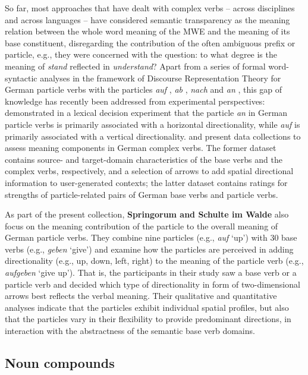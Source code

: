 \documentclass[output=paper]{langsci/langscibook}
\begin{document}
So far, most approaches that have dealt with complex verbs -- across
disciplines and across languages -- have considered semantic
transparency as the meaning relation between the whole word meaning of
the MWE and the meaning of its base constituent, disregarding the
contribution of the often ambiguous prefix or particle, e.g., they
were concerned with the question: to what degree is the meaning of
\textit{stand} reflected in \textit{understand}? Apart from a series
of formal word-syntactic analyses in the framework of
Discourse Representation Theory \citep{Kamp/Reyle:93} for
German particle verbs with the particles \textit{auf}
\citep{Lechler/Rossdeutscher:09}, \textit{ab} \citep{Kliche:11}, \textit{nach}
\citep{Haselbach:11} and 
\textit{an} \citep{Springorum:11}, this gap of knowledge has recently been
addressed from experimental perspectives: \cite{FrassinelliEtAl:17}
demonstrated in a lexical decision experiment that the particle
\textit{an} in German particle verbs is primarily associated with a
horizontal directionality, while \textit{auf} is primarily associated
with a vertical directionality. \citet{SchulteImWaldeEtAl:18} and
\citet{Koeper/SchulteImWalde:18} present data collections to assess
meaning components in German complex verbs. The former dataset
contains source- and target-domain characteristics of the base verbs
and the complex verbs, respectively, and a selection of arrows to add
spatial directional information to user-generated contexts; the latter
dataset contains ratings for strengths of particle-related pairs of
German base verbs and particle verbs.

As part of the present collection, \textbf{Springorum and Schulte im
  Walde} also focus on the meaning contribution of the particle to the
overall meaning of German particle verbs. They combine nine particles
(e.g., \textit{auf} `up') with 30 base verbs (e.g., \textit{geben}
`give') and examine how the particles are perceived in adding
directionality (e.g., up, down, left, right) to the meaning of the
particle verb (e.g., \textit{aufgeben} `give up'). That is, the
participants in their study saw a base verb or a particle verb and
decided which type of directionality in form of two-dimensional arrows
best reflects the verbal meaning. Their qualitative and quantitative
analyses indicate that the particles exhibit individual spatial
profiles, but also that the particles vary in their flexibility to
provide predominant directions, in interaction with the abstractness
of the semantic base verb domains.


\subsection{Noun compounds}
\label{sec:compounds}
\end{document}
